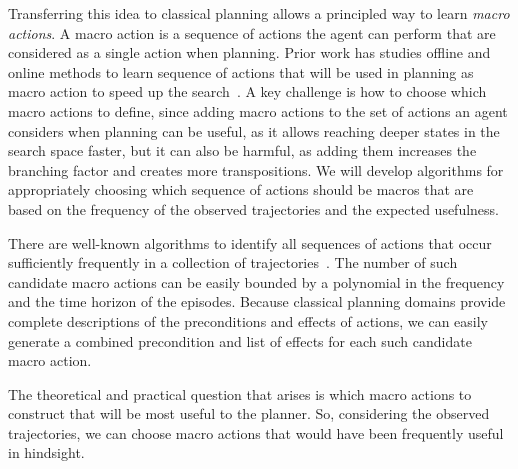 \documentclass[12pt]{article}
\begin{document}
Transferring this idea to classical planning allows a principled way to learn {\em macro actions}. A macro action is a sequence of actions the agent can perform that are considered as a single action when planning. Prior work has studies offline and online methods to learn sequence of actions that will be used in planning as macro action to speed up the search~\cite{chrpa2014mum,coles2007marvin,chrpa2015online,koedinger1990abstract,korf1985macro}. A key challenge is how to choose which macro actions to define, since adding macro actions to the set of actions an agent considers when planning can be useful, as it allows reaching deeper states in the search space faster, but it can also be harmful, as adding them increases the branching factor and creates more transpositions. We will develop algorithms for appropriately choosing which sequence of actions should be macros that are based on the frequency of the observed trajectories and the expected usefulness.  


There are well-known algorithms to identify all sequences of actions that occur sufficiently frequently in a collection of trajectories~\cite{mannila1997sequences}. The number of such candidate macro actions can be easily bounded by a polynomial in the frequency and the time horizon of the episodes. Because classical planning domains provide complete descriptions of the preconditions and effects of actions, we can easily generate a combined precondition and list of effects for each such candidate macro action.

The theoretical and practical question that arises is which macro actions to construct that will be most useful to the planner. 
So, considering the observed trajectories, we can choose macro actions that would have been frequently useful in hindsight. 
\end{document}
